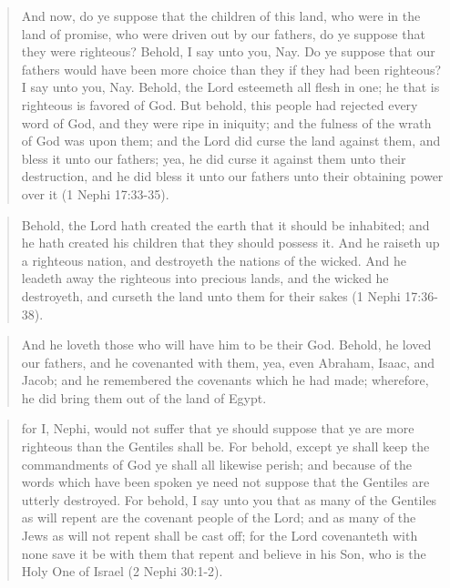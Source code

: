 \begin{quotation}
And now, do ye suppose that the children of this land, who were in the land of promise, who were driven out by our fathers, do ye suppose that they were righteous? Behold, I say unto you, Nay. Do ye suppose that our fathers would have been more choice than they if they had been righteous? I say unto you, Nay. Behold, the Lord esteemeth all flesh in one; he that is righteous is favored of God. But behold, this people had rejected every word of God, and they were ripe in iniquity; and the fulness of the wrath of God was upon them; and the Lord did curse the land against them, and bless it unto our fathers; yea, he did curse it against them unto their destruction, and he did bless it unto our fathers unto their obtaining power over it (1 Nephi 17:33-35).
\end{quotation}

\begin{quotation}
Behold, the Lord hath created the earth that it should be inhabited; and he hath created his children that they should possess it. And he raiseth up a righteous nation, and destroyeth the nations of the wicked. And he leadeth away the righteous into precious lands, and the wicked he destroyeth, and curseth the land unto them for their sakes (1 Nephi 17:36-38).
\end{quotation}

\begin{quotation}
And he loveth those who will have him to be their God. Behold, he loved our fathers, and he covenanted with them, yea, even Abraham, Isaac, and Jacob; and he remembered the covenants which he had made; wherefore, he did bring them out of the land of Egypt. 
\end{quotation}

\begin{quotation}
for I, Nephi, would not suffer that ye should suppose that ye are more righteous than the Gentiles shall be. For behold, except ye shall keep the commandments of God ye shall all likewise perish; and because of the words which have been spoken ye need not suppose that the Gentiles are utterly destroyed. For behold, I say unto you that as many of the Gentiles as will repent are the covenant people of the Lord; and as many of the Jews as will not repent shall be cast off; for the Lord covenanteth with none save it be with them that repent and believe in his Son, who is the Holy One of Israel (2 Nephi 30:1-2).
\end{quotation}


